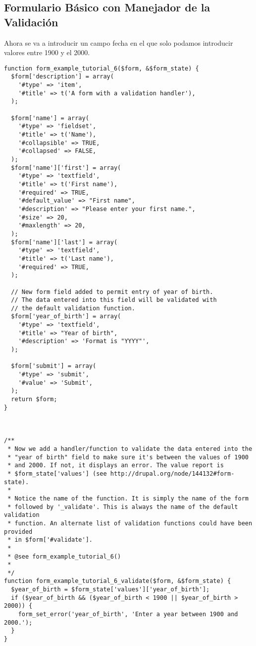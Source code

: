 \documentclass[11pt]{article}
\begin{document}
\subsection{Formulario Básico con Manejador de la Validación}
\label{sec-4.8}


Ahora se va a introducir un campo fecha en el que solo podamos
introducir valores entre 1900 y el 2000.


\begin{verbatim}
function form_example_tutorial_6($form, &$form_state) {
  $form['description'] = array(
    '#type' => 'item',
    '#title' => t('A form with a validation handler'),
  );

  $form['name'] = array(
    '#type' => 'fieldset',
    '#title' => t('Name'),
    '#collapsible' => TRUE,
    '#collapsed' => FALSE,
  );
  $form['name']['first'] = array(
    '#type' => 'textfield',
    '#title' => t('First name'),
    '#required' => TRUE,
    '#default_value' => "First name",
    '#description' => "Please enter your first name.",
    '#size' => 20,
    '#maxlength' => 20,
  );
  $form['name']['last'] = array(
    '#type' => 'textfield',
    '#title' => t('Last name'),
    '#required' => TRUE,
  );

  // New form field added to permit entry of year of birth.
  // The data entered into this field will be validated with
  // the default validation function.
  $form['year_of_birth'] = array(
    '#type' => 'textfield',
    '#title' => "Year of birth",
    '#description' => 'Format is "YYYY"',
  );

  $form['submit'] = array(
    '#type' => 'submit',
    '#value' => 'Submit',
  );
  return $form;
}



/**
 * Now we add a handler/function to validate the data entered into the
 * "year of birth" field to make sure it's between the values of 1900
 * and 2000. If not, it displays an error. The value report is
 * $form_state['values'] (see http://drupal.org/node/144132#form-state).
 *
 * Notice the name of the function. It is simply the name of the form
 * followed by '_validate'. This is always the name of the default validation
 * function. An alternate list of validation functions could have been provided
 * in $form['#validate'].
 *
 * @see form_example_tutorial_6()
 *
 */
function form_example_tutorial_6_validate($form, &$form_state) {
  $year_of_birth = $form_state['values']['year_of_birth'];
  if ($year_of_birth && ($year_of_birth < 1900 || $year_of_birth > 2000)) {
    form_set_error('year_of_birth', 'Enter a year between 1900 and 2000.');
  }
}
\end{verbatim}
\end{document}
